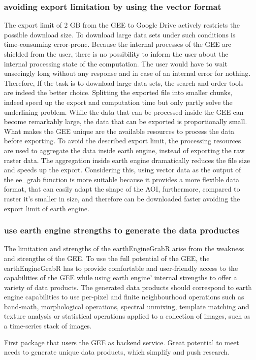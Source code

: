 \subsubsection{avoiding export limitation by using the vector format}

The export limit of 2 GB from the GEE to Google Drive actively restricts the possible download size. To download large data sets under such conditions is time-consuming error-prone. Because the internal processes of the GEE are shielded from the user, there is no possibility to inform the user about the internal processing state of the computation. The user would have to wait unseeingly long without any response and in case of an internal error for nothing.
Therefore, If the task is to download large data sets, the search and order tools are indeed the better choice.
Splitting the exported file into smaller chunks, indeed speed up the export and computation time but only partly solve the underlining problem.
While the data that can be processed inside the GEE can become remarkably large, the data that can be exported is proportionally small.
What makes the GEE unique are the available resources to process the data before exporting. To avoid the described export limit, the processing resources are used to aggregate the data inside earth engine, instead of exporting the raw raster data. The aggregation inside earth engine dramatically reduces the file size and speeds up the export. 
Considering this, using vector data as the output of the ee\_grab function is more suitable because it provides a more flexible data format, that can easily adapt the shape of the AOI, furthermore, compared to raster it's smaller in size, and therefore can be downloaded faster avoiding the export limit of earth engine. 

\subsubsection{use earth engine strengths to generate the data productes}

The limitation and strengths of the earthEngineGrabR arise from the weakness and strengths of the GEE.
To use the full potential of the GEE, the earthEngineGrabR has to provide comfortable and user-friendly access to the capabilities of the GEE while using earth engine' internal strengths to offer a variety of data products.
The generated data products should correspond to earth engine capabilities to use per-pixel and finite neighbourhood operations such as band-math, morphological operations, spectral unmixing, template matching and texture analysis or statistical operations applied to a collection of images, such as a time-series stack of images. 









First package that users the GEE as backend service.
Great potential to meet needs to generate unique data products, which simplify and push research.






